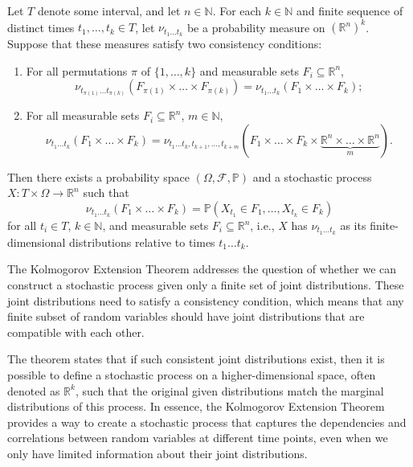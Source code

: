 \begin{theorem}
	Let $T$ denote some interval, and let $n \in \mathbb{N}$. For each $k \in \mathbb{N}$ and finite sequence of distinct times $t_1, \ldots, t_k \in T$, let $\nu_{t_1 \ldots t_k}$ be a probability measure on $(\mathbb{R}^n)^k$. Suppose that these measures satisfy two consistency conditions:
	
	\begin{enumerate}
		\item For all permutations $\pi$ of $\{1, \ldots, k\}$ and measurable sets $F_i \subseteq \mathbb{R}^n$,
		\[
		\nu_{t_{\pi(1)}\ldots t_{\pi(k)}}\left(F_{\pi(1)} \times \ldots \times F_{\pi(k)}\right) = \nu_{t_1 \ldots t_k}\left(F_1 \times \ldots \times F_k\right);
		\]
		\item For all measurable sets $F_i \subseteq \mathbb{R}^n$, $m \in \mathbb{N}$,
		\[
		\nu_{t_1 \ldots t_k}(F_1 \times \ldots \times F_k) = \nu_{t_1 \ldots t_k, t_{k+1}, \ldots, t_{k+m}}\left(F_1 \times \ldots \times F_k \times \underbrace{\mathbb{R}^n \times \ldots \times \mathbb{R}^n}_m\right).
		\]
	\end{enumerate}
	
	Then there exists a probability space $(\Omega, \mathcal{F}, \mathbb{P})$ and a stochastic process $X: T \times \Omega \to \mathbb{R}^n$ such that
	\[
	\nu_{t_1 \ldots t_k}(F_1 \times \ldots \times F_k) = \mathbb{P}(X_{t_1} \in F_1, \ldots, X_{t_k} \in F_k)
	\]
	for all $t_i \in T$, $k \in \mathbb{N}$, and measurable sets $F_i \subseteq \mathbb{R}^n$, i.e., $X$ has $\nu_{t_1 \ldots t_k}$ as its finite-dimensional distributions relative to times $t_1 \ldots t_k$.
	
\end{theorem}

The Kolmogorov Extension Theorem addresses the question of whether we can construct a stochastic process given only a finite set of joint distributions. These joint distributions need to satisfy a consistency condition, which means that any finite subset of random variables should have joint distributions that are compatible with each other.

The theorem states that if such consistent joint distributions exist, then it is possible to define a stochastic process on a higher-dimensional space, often denoted as $\mathbb{R}^k$, such that the original given distributions match the marginal distributions of this process. In essence, the Kolmogorov Extension Theorem provides a way to create a stochastic process that captures the dependencies and correlations between random variables at different time points, even when we only have limited information about their joint distributions. 

